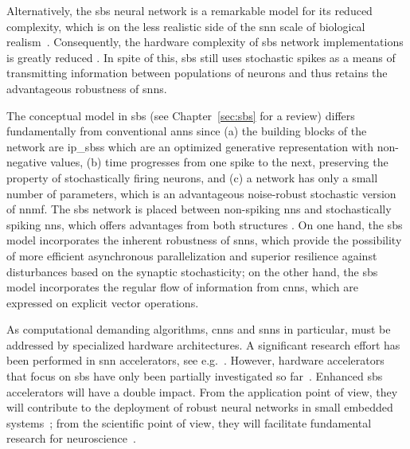 	Alternatively, the \gls{sbs} neural network is a remarkable model for its reduced complexity, which is on the less realistic side of the \gls{snn} scale of biological realism~\cite{rotermund2019Backpropagation,ernst2007efficient}. Consequently, the hardware complexity of \gls{sbs} network implementations is greatly reduced
	\cite{nevarez2020accelerator,rotermund2018massively}. In spite of this, \gls{sbs} still uses stochastic spikes as a means of transmitting information between populations of neurons and thus retains the advantageous robustness of \glspl{snn}.


The conceptual model in \gls{sbs} (see Chapter~\ref{sec:sbs} for a review) differs fundamentally from conventional \glspl{ann} since (a) the building blocks of the network are \glspl{ip_sbs} which are an optimized generative representation with non-negative values, (b) time progresses from one spike to the next, preserving the property of stochastically firing neurons, and (c) a network has only a small number of parameters, which is an advantageous noise-robust stochastic version of \gls{nnmf}. The \gls{sbs} network is placed between non-spiking \glspl{nn} and stochastically spiking \glspl{nn}, which offers advantages from both structures \cite{rotermund2019Backpropagation}. On one hand, the \gls{sbs} model incorporates the inherent robustness of \glspl{snn}, which provide the possibility of more efficient asynchronous parallelization and superior resilience against disturbances based on the synaptic stochasticity; on the other hand, the \gls{sbs} model incorporates the regular flow of information from \glspl{cnn}, which are expressed on explicit vector operations.  


As computational demanding algorithms, \glspl{cnn} and \glspl{snn} in particular, must be addressed by specialized hardware architectures. A significant research effort has been performed in \gls{snn} accelerators, see e.g.~\cite{roy2019towards,bouvier2019spiking, young2019review,TrueNorth_Trans15,Spinnaker_Trans13,davies2018loihi}.
  However, hardware accelerators that focus on \gls{sbs} have only been partially investigated so far~\cite{nevarez2020accelerator,rotermund2018massively}.
  Enhanced \gls{sbs} accelerators will have a double impact. From the application point of view, they will contribute to the deployment of robust neural networks in small embedded systems~\cite{nevarez2020accelerator}; from the scientific point of view, they will facilitate fundamental research for neuroscience~\cite{ernst2007efficient,rotermund2019recurrentsbs, dayan2001theoretical}.

